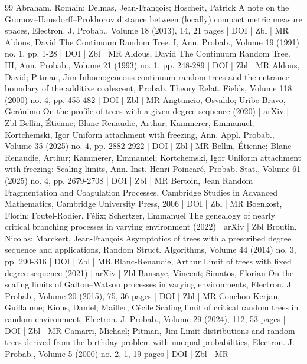 \begin{thebibliography}{99}
 Abraham, Romain; Delmas, Jean-François; Hoscheit, Patrick A note on the Gromov–Hausdorff–Prokhorov distance between (locally) compact metric measure spaces, Electron. J. Probab., Volume 18 (2013), 14, 21 pages | DOI | Zbl | MR
 Aldous, David The Continuum Random Tree. I, Ann. Probab., Volume 19 (1991) no. 1, pp. 1-28 | DOI | Zbl | MR
 Aldous, David The Continuum Random Tree. III, Ann. Probab., Volume 21 (1993) no. 1, pp. 248-289 | DOI | Zbl | MR
 Aldous, David; Pitman, Jim Inhomogeneous continuum random trees and the entrance boundary of the additive coalescent, Probab. Theory Relat. Fields, Volume 118 (2000) no. 4, pp. 455-482 | DOI | Zbl | MR
 Angtuncio, Osvaldo; Uribe Bravo, Gerónimo On the profile of trees with a given degree sequence (2020) | arXiv | Zbl
 Bellin, Étienne; Blanc-Renaudie, Arthur; Kammerer, Emmanuel; Kortchemski, Igor Uniform attachment with freezing, Ann. Appl. Probab., Volume 35 (2025) no. 4, pp. 2882-2922 | DOI | Zbl | MR
 Bellin, Étienne; Blanc-Renaudie, Arthur; Kammerer, Emmanuel; Kortchemski, Igor Uniform attachment with freezing: Scaling limits, Ann. Inst. Henri Poincaré, Probab. Stat., Volume 61 (2025) no. 4, pp. 2679-2708 | DOI | Zbl | MR
 Bertoin, Jean Random Fragmentation and Coagulation Processes, Cambridge Studies in Advanced Mathematics, Cambridge University Press, 2006 | DOI | Zbl | MR
 Boenkost, Florin; Foutel-Rodier, Félix; Schertzer, Emmanuel The genealogy of nearly critical branching processes in varying environment (2022) | arXiv | Zbl
 Broutin, Nicolas; Marckert, Jean-François Asymptotics of trees with a prescribed degree sequence and applications, Random Struct. Algorithms, Volume 44 (2014) no. 3, pp. 290-316 | DOI | Zbl | MR
 Blanc-Renaudie, Arthur Limit of trees with fixed degree sequence (2021) | arXiv | Zbl
 Bansaye, Vincent; Simatos, Florian On the scaling limits of Galton–Watson processes in varying environments, Electron. J. Probab., Volume 20 (2015), 75, 36 pages | DOI | Zbl | MR
 Conchon-Kerjan, Guillaume; Kious, Daniel; Mailler, Cécile Scaling limit of critical random trees in random environment, Electron. J. Probab., Volume 29 (2024), 112, 53 pages | DOI | Zbl | MR
 Camarri, Michael; Pitman, Jim Limit distributions and random trees derived from the birthday problem with unequal probabilities, Electron. J. Probab., Volume 5 (2000) no. 2, 1, 19 pages | DOI | Zbl | MR

\end{thebibliography}
